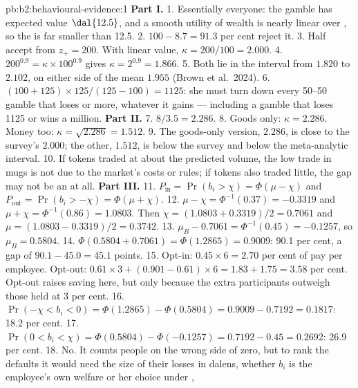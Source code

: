 \begin{solution}{pb:b2:behavioural-evidence:1}
\textbf{Part I.}
1. Essentially everyone: the gamble has expected value $\dal{12.5}$, and a smooth utility of wealth is
nearly linear over , so the  is far smaller than 12.5.
2. $100 - 8.7 = 91.3$ per cent reject it.
3. Half accept from $z_+ = 200$. With linear value, $\kappa = 200/100 = 2.000$.
4. $200^{0.9} = \kappa \times 100^{0.9}$ gives $\kappa = 2^{0.9} = 1.866$.
5. Both lie in the interval from $1.820$ to $2.102$, on either side of the mean $1.955$
(Brown et al.\ 2024).
6. $(100 + 125) \times 125/(125 - 100) = 1125$: she must turn down every 50--50 gamble that loses
 or more, whatever it gains --- including a gamble that loses 1125 or wins a million.
\textbf{Part II.}
7. $8/3.5 = 2.286$.
8. Goods only: $\kappa = 2.286$. Money too: $\kappa = \sqrt{2.286} = 1.512$.
9. The goods-only version, $2.286$, is close to the survey's $2.000$; the other, $1.512$, is below the
survey and below the meta-analytic interval.
10. If tokens traded at about the predicted volume, the low trade in mugs is not due to the market's
costs or rules; if tokens also traded little, the gap may not be an  at all.
\textbf{Part III.}
11. $P_{\text{in}} = \Pr(b_i > \chi) = \Phi(\mu - \chi)$ and $P_{\text{out}} = \Pr(b_i > -\chi) =
\Phi(\mu + \chi)$.
12. $\mu - \chi = \Phi^{-1}(0.37) = -0.3319$ and $\mu + \chi = \Phi^{-1}(0.86) = 1.0803$. Then $\chi =
(1.0803 + 0.3319)/2 = 0.7061$ and $\mu = (1.0803 - 0.3319)/2 = 0.3742$.
13. $\mu_B - 0.7061 = \Phi^{-1}(0.45) = -0.1257$, so $\mu_B = 0.5804$.
14. $\Phi(0.5804 + 0.7061) = \Phi(1.2865) = 0.9009$: 90.1 per cent, a gap of $90.1 - 45.0 = 45.1$ points.
15. Opt-in: $0.45 \times 6 = 2.70$ per cent of pay per employee. Opt-out: $0.61 \times 3 + (0.901 - 0.61)
\times 6 = 1.83 + 1.75 = 3.58$ per cent. Opt-out raises saving here, but only because the extra
participants outweigh those held at 3 per cent.
16. $\Pr(-\chi < b_i < 0) = \Phi(1.2865) - \Phi(0.5804) = 0.9009 - 0.7192 = 0.1817$: 18.2 per cent.
17. $\Pr(0 < b_i < \chi) = \Phi(0.5804) - \Phi(-0.1257) = 0.7192 - 0.45 = 0.2692$: 26.9 per cent.
18. No. It counts people on the wrong side of zero, but to rank the defaults it would need the size of
their losses in dalens, whether $b_i$ is the employee's own welfare or her choice under ,

\end{solution}
